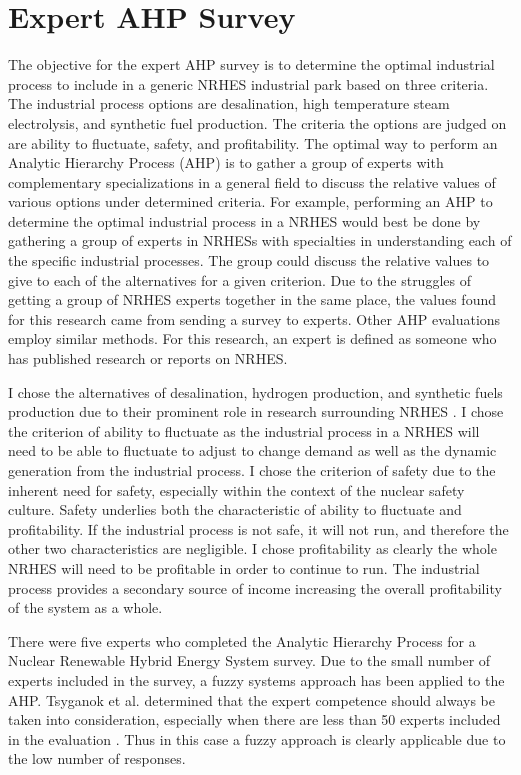 \section{Expert AHP Survey}
The objective for the expert AHP survey is to determine the optimal industrial process to include in a generic NRHES industrial park based on three criteria. The industrial process options are desalination, high temperature steam electrolysis, and synthetic fuel production. The criteria the options are judged on are ability to fluctuate, safety, and profitability. The optimal way to perform an Analytic Hierarchy Process (AHP) is to gather a group of experts with complementary specializations in a general field to discuss the relative values of various options under determined criteria. For example, performing an AHP to determine the optimal industrial process in a NRHES would best be done by gathering a group of experts in NRHESs with specialties in understanding each of the specific industrial processes. The group could discuss the relative values to give to each of the alternatives for a given criterion. Due to the struggles of getting a group of NRHES experts together in the same place, the values found for this research came from sending a survey to experts.  Other AHP evaluations employ similar methods\cite{Pan2008}. For this research, an expert is defined as someone who has published research or reports on NRHES.

	I chose the alternatives of desalination, hydrogen production, and synthetic fuels production due to their prominent role in research surrounding NRHES \cite{Bragg-Sitton2014,Locatelli2015,Kim2016,Bragg-Sitton2016,Garcia2016,Shropshire2011, Ruth2014,Bienvenu2015}.  I chose the criterion of ability to fluctuate as the industrial process in a NRHES will need to be able to fluctuate to adjust to change demand as well as the dynamic generation from the industrial process.  I chose the criterion of safety due to the inherent need for safety, especially within the context of the nuclear safety culture.  Safety underlies both the characteristic of ability to fluctuate and profitability. If the industrial process is not safe, it will not run, and therefore the other two characteristics are negligible. I chose profitability as clearly the whole NRHES will need to be profitable in order to continue to run.  The industrial process provides a secondary source of income  increasing the overall profitability of the system as a whole.

There were five experts who completed the Analytic Hierarchy Process for a Nuclear Renewable Hybrid Energy System survey. Due to the small number of experts included in the survey, a fuzzy systems approach has been applied to the AHP. Tsyganok et al. determined that the expert competence should always be taken into consideration, especially when there are less than 50 experts included in the evaluation \cite{Tsyganok2012}. Thus in this case a fuzzy approach is clearly applicable due to the low number of responses.

